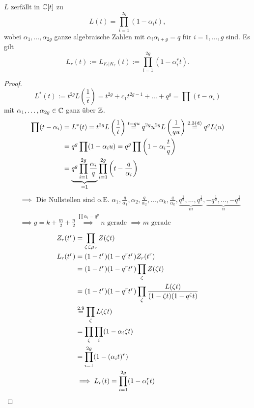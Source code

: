\begin{satz}
    $L$ zerfällt in $\mathbb{C}[t]$ zu
    $$ L(t) = \prod_{i=1}^{2g} (1-\alpha_it), $$
    wobei $\alpha_1, \ldots, \alpha_{2g}$ ganze algebraische Zahlen mit 
    $\alpha_i \alpha_{i+g} = q$ für $i=1,\ldots,g$ sind. Es gilt
    $$ L_r (t) := L_{F_r|K_r}(t) := \prod_{i=1}^{2g}(1-\alpha_i^r t).$$ 
\end{satz}
\begin{proof}
    $$ L^\ast(t) := t^{2g}L\left(\frac{1}{t}\right) = t^{2g} + c_1 t^{2g -1} + \ldots + q^g = \prod (t - \alpha_i)$$
    mit $\alpha_1,\ldots,\alpha_{2g} \in \mathbb{C}$ ganz über $\mathbb{Z}$.
    \begin{align*}
        \prod (t - \alpha_i) &= L^\ast(t) = t^{2g}L\left(\frac{1}{t}\right) \stackrel{t=qu}{=} q^{2g}u^{2g}L\left(\frac{1}{qu}\right)
            \stackrel{\text{2.3(d)}}{=} q^g L(u) \\
            & = q^g \prod (1- \alpha_i u) = q^g \prod \left(1-\alpha_i\frac{t}{q}\right)\\
            & = \underbrace{q^g\prod_{i=1}^{2g}\frac{\alpha_i}{q}}_{= 1}\prod_{i=1}^{2g} \left(t-\frac{q}{\alpha_i}\right)\\
    \end{align*}
    \begin{align*}
        & \implies \text{ Die Nullstellen sind o.E. } \alpha_1, \frac{q}{\alpha_1}, \alpha_2, \frac{q}{\alpha_2}, \ldots, \alpha_k,
            \frac{q}{\alpha_k}, \underbrace{q^{\frac{1}{2}}, \ldots, q^{\frac{1}{2}}}_{m}, \underbrace{-q^{\frac{1}{2}}, \ldots, -q^{\frac{1}{2}}}_{n}\\
        & \implies g = k + \frac{m}{2} + \frac{n}{2} \stackrel{\prod \alpha_i = q^g}{\implies} n \text{ gerade } \implies m \text{ gerade}
    \end{align*}
    \begin{align*}
        Z_r(t^r) &= \prod_{\zeta \in \mu_r} Z(\zeta t)\\
        L_r(t^r) &= (1-t^r)(1-q^rt^r)Z_r(t^r)\\
            &= (1-t^r)(1-q^rt^r)\prod_\zeta Z(\zeta t)\\
            &= (1-t^r)(1-q^rt^r)\prod_{\zeta} \frac{L(\zeta t)}{(1-\zeta t)(1 - q^\zeta t)}\\
            & \stackrel{\text{2.9}}{=} \prod_\zeta L(\zeta t)\\
            &= \prod_\zeta \prod_i (1-\alpha_i \zeta t)\\
            &= \prod_{i=1}^{2g} (1 - (\alpha_i t)^r)\\
        & \implies L_r(t) = \prod_{i=1}^{2g} (1 - \alpha_i^r t)
    \end{align*}
\end{proof}

